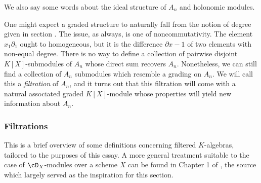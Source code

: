 We also say some words about the ideal structure of $A_n$ and holonomic modules.

One might expect a graded structure to naturally fall from the notion of degree given in section . The issue, as always, is one of noncommutativity. The element $x_1\partial_1$ ought to homogeneous, but it is the difference $\partial x - 1$ of two elements with non-equal degree. There is no way to define a collection of pairwise disjoint $K[X]$-submodules of $A_n$ whose direct sum recovers $A_n$. Nonetheless, we can still find a collection of $A_n$ submodules which resemble a grading on $A_n$. We will call this a \emph{filtration} of $A_n$, and it turns out that this filtration will come with a natural associated graded $K[X]$-module whose properties will yield new information about $A_n$.

\subsubsection{Filtrations}

This is a brief overview of some definitions concerning filtered $K$-algebras, tailored to the purposes of this essay. A more general treatment suitable to the case of $\cD_X$-modules over a scheme $X$ can be found in Chapter 1 of \cite{ginzburg_d-mod}, the source which largely served as the inspiration for this section.

